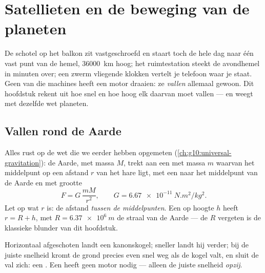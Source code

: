 \chapter{Satellieten en de beweging van de planeten}\label{ch:g12:satellites-kepler}

De schotel op het balkon zit vastgeschroefd en staart toch de hele dag naar
één vast punt van de hemel, \qty{36000}{km} hoog; het ruimtestation steekt
de avondhemel in minuten over; een zwerm vliegende klokken vertelt je
telefoon waar je staat. Geen van die machines heeft een motor draaien: ze
\emph{vallen} allemaal gewoon. Dit hoofdstuk rekent uit hoe snel en hoe hoog
elk daarvan moet vallen --- en weegt met dezelfde wet planeten.

\section{Vallen rond de Aarde}

Alles rust op de wet die we eerder hebben opgemeten
(\cref{ch:g10:universal-gravitation}): de Aarde, met massa $M$, trekt aan een
 met massa $m$ waarvan het middelpunt op een afstand $r$ van het
hare ligt, met een  naar het middelpunt van de Aarde en met grootte
\[ F = G\,\frac{m M}{r^2}, \qquad G = \qty{6.67e-11}{N.m^2/kg^2}. \]
Let op wat $r$ is: de afstand \emph{tussen de middelpunten}. Een  op
hoogte $h$ heeft $r = R + h$, met $R = \qty{6.37e6}{m}$ de straal van de
Aarde --- de $R$ vergeten is de klassieke blunder van dit hoofdstuk.

\begin{remark}\label{rem:g12:satellites-kepler:cannon}
Horizontaal afgeschoten landt een kanonskogel; sneller landt hij verder; bij
de juiste snelheid kromt de grond precies even snel weg als de kogel valt, en
sluit de val zich: een . Een  heeft geen motor nodig ---
alleen de juiste snelheid \emph{opzij}.
\end{remark}

